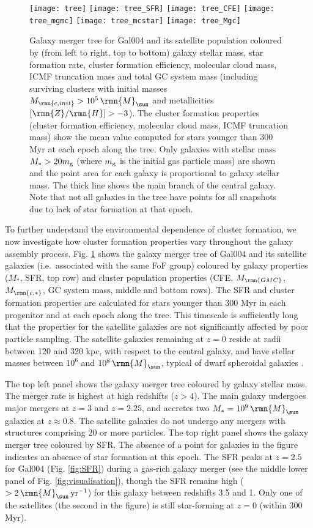 \documentclass[fleqn,usenatbib]{mnras}
\newcommand\Msun{\,\rmn{M}_{\sun}}
\newcommand{\pyr}{\,{\rm yr}^{-1}}
\newcommand\ZH{\lbrack \rmn{Z}/\rmn{H} \rbrack}
\newcommand{\Mcstar}{M_\rmn{c,\ast}}
\newcommand{\Mgmc}{M_\rmn{GMC}}
\begin{document}
\begin{figure*}
  \texttt{[image: tree]}
  \texttt{[image: tree\_SFR]}
  \texttt{[image: tree\_CFE]}
  \texttt{[image: tree\_mgmc]}
  \texttt{[image: tree\_mcstar]}
  \texttt{[image: tree\_Mgc]}
  \caption{Galaxy merger tree for Gal004 and its satellite population coloured by (from left to right, top to bottom) galaxy stellar mass, star formation rate, cluster formation efficiency, molecular cloud mass, ICMF truncation mass and total GC system mass (including surviving clusters with initial masses $M_\rmn{c,init}>10^5 \Msun$ and metallicities $\ZH>-3$). The cluster formation properties (cluster formation efficiency, molecular cloud mass, ICMF truncation mass) show the mean value computed for stars younger than 300 Myr at each epoch along the tree. Only galaxies with stellar mass $M_\ast > 20 m_{\rm g}$ (where $m_{\rm g}$ is the initial gas particle mass) are shown and the point area for each galaxy is proportional to galaxy stellar mass. The thick line shows the main branch of the central galaxy. Note that not all galaxies in the tree have points for all snapshots due to lack of star formation at that epoch.}
  \label{fig:trees}
\end{figure*}

To further understand the environmental dependence of cluster formation, we now investigate how cluster formation properties vary throughout the galaxy assembly process.
Fig. \ref{fig:trees} shows the galaxy merger tree of Gal004 and its satellite galaxies (i.e.~associated with the same FoF group) coloured by galaxy properties ($M_\ast$, SFR, top row) and cluster population properties (CFE, $\Mgmc$, $\Mcstar$, GC system mass, middle and bottom rows). The SFR and cluster formation properties are calculated for stars younger than 300 Myr in each progenitor and at each epoch along the tree. This timescale is sufficiently long that the properties for the satellite galaxies are not significantly affected by poor particle sampling. The satellite galaxies remaining at $z=0$ reside at radii between 120 and 320 kpc, with respect to the central galaxy, and have stellar masses between $10^6$ and $10^8 \Msun$, typical of dwarf spheroidal galaxies \citep[e.g.][]{McConnachie_12}. 

The top left panel shows the galaxy merger tree coloured by galaxy stellar mass. The merger rate is highest at high redshifts ($z>4$). The main galaxy undergoes major mergers at $z=3$ and $z=2.25$, and accretes two $M_\ast = 10^9 \Msun$ galaxies at $z\approx0.8$. The satellite galaxies do not undergo any mergers with structures comprising 20 or more particles.
The top right panel shows the galaxy merger tree coloured by SFR. The absence of a point for galaxies in the figure  indicates an absence of star formation at this epoch. The SFR peaks at $z=2.5$ for Gal004 (Fig. \ref{fig:SFR}) during a gas-rich galaxy merger (see the middle lower panel of Fig. \ref{fig:visualisation}), though the SFR remains high ($>2 \Msun \pyr$) for this galaxy between redshifts 3.5 and 1.
Only one of the satellites (the second in the figure) is still star-forming at $z=0$ (within 300 Myr).
\end{document}
